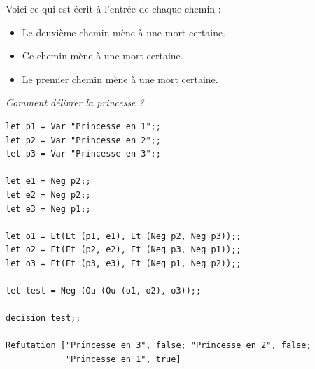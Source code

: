 Voici ce qui est écrit à l'entrée de chaque chemin :
\begin{itemize}
\item Le deuxième chemin mène à une mort certaine.
\item Ce chemin mène à une mort certaine.
\item Le premier chemin mène à une mort certaine.
\end{itemize}
\begin{Exercise}\it Comment délivrer la princesse ?
\end{Exercise}
\begin{Answer} 
\begin{lstlisting}
let p1 = Var "Princesse en 1";;
let p2 = Var "Princesse en 2";;
let p3 = Var "Princesse en 3";;

let e1 = Neg p2;;
let e2 = Neg p2;;
let e3 = Neg p1;;

let o1 = Et(Et (p1, e1), Et (Neg p2, Neg p3));;
let o2 = Et(Et (p2, e2), Et (Neg p3, Neg p1));;
let o3 = Et(Et (p3, e3), Et (Neg p1, Neg p2));;

let test = Neg (Ou (Ou (o1, o2), o3));;

decision test;;

Refutation ["Princesse en 3", false; "Princesse en 2", false; 
            "Princesse en 1", true]
\end{lstlisting}
\end{Answer}
\newpage




